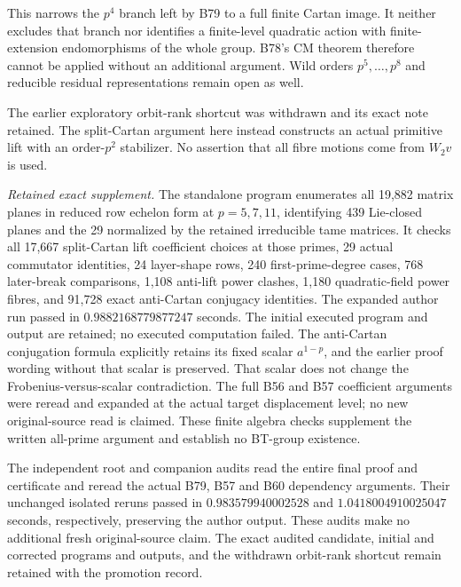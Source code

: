 \begin{remark}
\label{rem:B-RD80-scope}
This narrows the \(p^4\) branch left by B79 to a full finite
Cartan image. It neither excludes that branch nor identifies a
finite-level quadratic action with finite-extension endomorphisms
of the whole group. B78's CM theorem therefore cannot be applied
without an additional argument. Wild orders \(p^5,\ldots,p^8\)
and reducible residual representations remain open as well.

The earlier exploratory orbit-rank shortcut was withdrawn and its
exact note retained. The split-Cartan argument here instead constructs
an actual primitive lift with an order-\(p^2\) stabilizer. No assertion
that all fibre motions come from \(W_2v\) is used.


\smallskip
\noindent\emph{Retained exact supplement.}
The standalone program
enumerates all 19,882 matrix planes in reduced row echelon form at
\(p=5,7,11\), identifying 439 Lie-closed planes and the 29
normalized by the retained irreducible tame matrices. It checks
all 17,667 split-Cartan lift coefficient choices at those primes,
29 actual commutator identities, 24 layer-shape rows, 240
first-prime-degree cases, 768 later-break comparisons, 1,108
anti-lift power clashes, 1,180 quadratic-field power fibres,
and 91,728 exact anti-Cartan conjugacy identities.
The expanded author run passed in \(0.9882168779877247\) seconds.
The initial executed program and output are retained; no executed
computation failed. The anti-Cartan conjugation formula explicitly
retains its fixed scalar \(a^{1-p}\), and the earlier proof wording
without that scalar is preserved. That scalar does not change the
Frobenius-versus-scalar contradiction.
The full B56 and B57 coefficient arguments were reread and expanded
at the actual target displacement level; no new original-source read
is claimed. These finite algebra checks supplement the written
all-prime argument and establish no BT-group existence.

The independent root and companion audits read the entire final proof
and certificate and reread the actual B79, B57 and B60 dependency
arguments. Their unchanged isolated reruns passed in
\(0.983579940002528\) and \(1.0418004910025047\) seconds,
respectively, preserving the author output. These audits make no
additional fresh original-source claim. The exact audited candidate,
initial and corrected programs and outputs, and the withdrawn
orbit-rank shortcut remain retained with the promotion record.
\end{remark}
